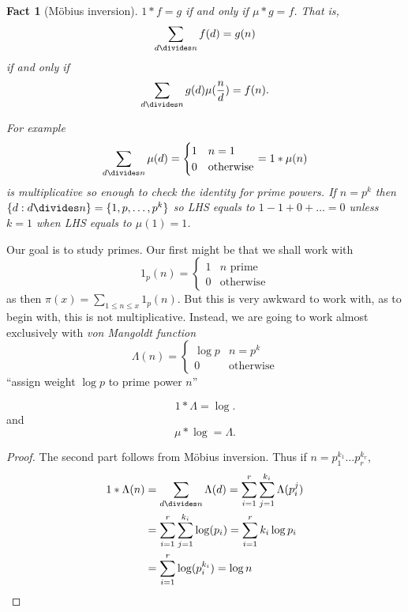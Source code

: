 \documentclass[a4paper]{article}
\newtheorem*{fact}{Fact}
\theoremstyle{definition}
\begin{document}
\begin{fact}[Möbius inversion]
  \(1 * f = g\) if and only if \(\mu * g = f\). That is,
  \[
    \sum_{d \divides n} f(d) = g(n)
  \]
  if and only if
  \[
    \sum_{d \divides n} g(d) \mu(\frac{n}{d}) = f(n).
  \]

  For example
  \[
    \sum_{d \divides n} \mu(d) =
    \begin{cases}
      1 & n = 1 \\
      0 & \text{otherwise}
    \end{cases}
    = 1 * \mu (n)
  \]
  is multiplicative so enough to check the identity for prime powers. If \(n = p^k\) then \(\{d: d \divides n\} = \{1, p, \dots, p^k\}\) so LHS equals to \(1 - 1 + 0 + \dots = 0\) unless \(k = 1\) when LHS equals to \(\mu(1) = 1\).
\end{fact}

Our goal is to study primes. Our first might be that we shall work with
\[
  1_p(n) =
  \begin{cases}
    1 & n \text{ prime} \\
    0 & \text{otherwise}
  \end{cases}
\]
as then \(\pi(x) = \sum_{1 \leq n \leq x} 1_p(n)\). But this is very awkward to work with, as to begin with, this is not multiplicative. Instead, we are going to work almost exclusively with \emph{von Mangoldt function}
\[
  \Lambda(n) =
  \begin{cases}
    \log p & n = p^k \\
    0 & \text{otherwise}
  \end{cases}
\]
``assign weight \(\log p\) to prime power \(n\)''

\begin{lemma}
  \[
    1 * \Lambda = \log.
  \]
  and
  \[
    \mu * \log = \Lambda.
  \]
\end{lemma}

\begin{proof}
  The second part follows from Möbius inversion. Thus if \(n = p_1^{k_1} \dots p_r^{k_r}\),
  \begin{align*}
    1 * \Lambda(n)
    &= \sum_{d \divides n} \Lambda(d)
    = \sum_{i = 1}^r \sum_{j = 1}^{k_i} \Lambda(p_i^j) \\
    &= \sum_{i = 1}^r \sum_{j = 1}^{k_i} \log(p_i)
    = \sum_{i = 1}^r k_i \log p_i \\
    &= \sum_{i = 1}^r \log (p_i^{k_i})
    = \log n
  \end{align*}
\end{proof}
\end{document}
